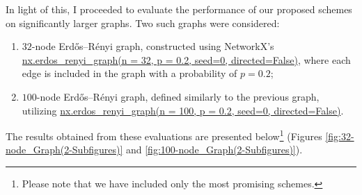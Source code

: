 In light of this, I proceeded to evaluate the performance of our proposed schemes on significantly larger graphs. Two such graphs were considered:
\begin{enumerate}
    \item $32$-node Erdős–Rényi graph, constructed using NetworkX's {\hypersetup{urlcolor=black}\url{nx.erdos\_renyi\_graph(n = 32, p = 0.2, seed=0, directed=False)}}, where each edge is included in the graph with a probability of $p = 0.2$;
    \item $100$-node Erdős–Rényi graph, defined similarly to the previous graph, utilizing {\hypersetup{urlcolor=black}\url{nx.erdos\_renyi\_graph(n = 100, p = 0.2, seed=0, directed=False)}}.
\end{enumerate}
The results obtained from these evaluations are presented below\footnote{Please note that we have included only the most promising schemes.} (Figures \ref{fig:32-node_Graph(2-Subfigures)} and \ref{fig:100-node_Graph(2-Subfigures)}).

